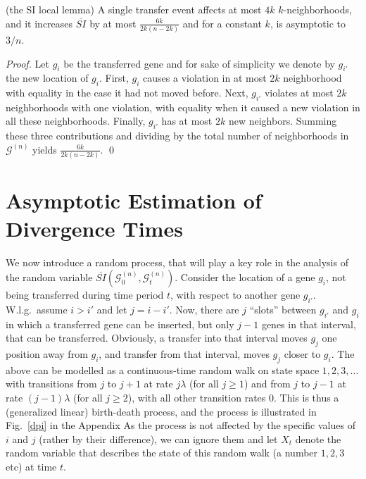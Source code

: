 \documentclass[runningheads, 11pt]{llncs}
\newcommand{\G}{\mathcal{G}^{(n)}}
\begin{document}
\begin{lemma}{ (the SI local lemma)}
\label{lem-local}
A single transfer event affects at most $4k$ $k$-neighborhoods, and it increases
$\overline{SI}$ by at most $\frac{6k}{2k(n-2k)}$ and for a constant $k$, is
asymptotic to $3/n$.
\end{lemma}
\begin{proof}
Let $g_i$ be the transferred gene and for sake of simplicity we denote by $g_{i'}
$ the new location of $g_i$. First, $g_i$ causes a violation in at most $2k$
neighborhood with equality in the case it had not moved before. Next, $g_{i'}$
violates at most $2k$ neighborhoods with one violation, with equality when it
caused a new violation in all these neighborhoods. Finally, $g_{i'}$ has at most
$2k$ new neighbors. Summing these three contributions and dividing by the total
number of neighborhoods in $\G$ yields $\frac{6k}{2k(n-2k)} $. \qed
\end{proof}




\section{Asymptotic Estimation of Divergence Times}
\label{sec-asymptotic}
We now introduce a random process, that will play a key role in the analysis of
the random variable $\overline{SI}(\G_0, \G_t)$. Consider the location of a gene
$g_i$, not being transferred during time period $t$, with respect to another gene
$g_{i'}$. W.l.g.\ assume $i> i'$ and let $j=i-i'$. Now, there are $j$ ``slots''
between $g_{i'}$ and $g_i$ in which a transferred gene can be inserted, but only
$j-1$ genes in that interval, that can be transferred. Obviously, a transfer
into that interval moves $g_j$ one position away from $g_i$, and transfer from
that interval, moves $g_j$ closer to $g_i$. The above can be modelled as a
continuous-time random walk on state space $1,2,3, \ldots$ with transitions from
$j$ to $j+1$ at rate $j\lambda$ (for all $j\geq 1$) and from $j$ to $j-1$ at
rate $(j-1)\lambda$ (for all $j\geq 2$), with all other transition rates 0. This
is thus a (generalized linear) birth-death process, and the process is
illustrated in Fig.~\ref{dpi} in the Appendix {As the process is not affected by
the specific values of $i$ and $j$ (rather by their difference), we can ignore
them and} let $X_t$ denote the random variable that describes the state of this
random walk (a number $1,2,3$ etc) at time $t$. 
\end{document}
